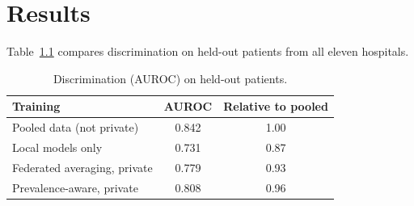 \chapter{Results}
\label{ch:results}

Table~\ref{tab:auroc} compares discrimination on held-out patients from all eleven hospitals.

\begin{table}[htbp]
  \centering
  \caption{Discrimination (AUROC) on held-out patients.}
  \label{tab:auroc}
  \begin{tabular}{lcc}
    \toprule
    Training & AUROC & Relative to pooled \\
    \midrule
    Pooled data (not private)          & 0.842 & 1.00 \\
    Local models only                  & 0.731 & 0.87 \\
    Federated averaging, private       & 0.779 & 0.93 \\
    Prevalence-aware, private          & 0.808 & 0.96 \\
    \bottomrule
  \end{tabular}
\end{table}
